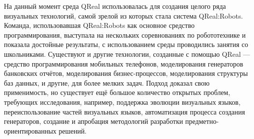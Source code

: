 \documentclass[a4]{article}
\begin{document}
На данный момент среда QReal использовалась для создания целого ряда визуальных технологий, самой зрелой из которых стала система QReal:Robots. Команда, использовавшая QReal:Robots как основное средство программирования, выступала на нескольких соревнованиях по робототехнике и показала достойные результаты, с использованием среды проводились занятия со школьниками. Существуют и другие технологии, созданные с помощью QReal --- средство программирования мобильных телефонов, моделирования генераторов банковских отчётов, моделирования бизнес-процессов, моделирования структуры баз данных, и другие, для более мелких задач. Подход доказал свою применимость, но существует ещё большое количество открытых проблем, требующих исследования, например, поддержка эволюции визуальных языков, переиспользование частей визуальных языков, автоматизация процесса создания генераторов, создание и апробация методологий разработки предметно-ориентированных решений.
\end{document}
